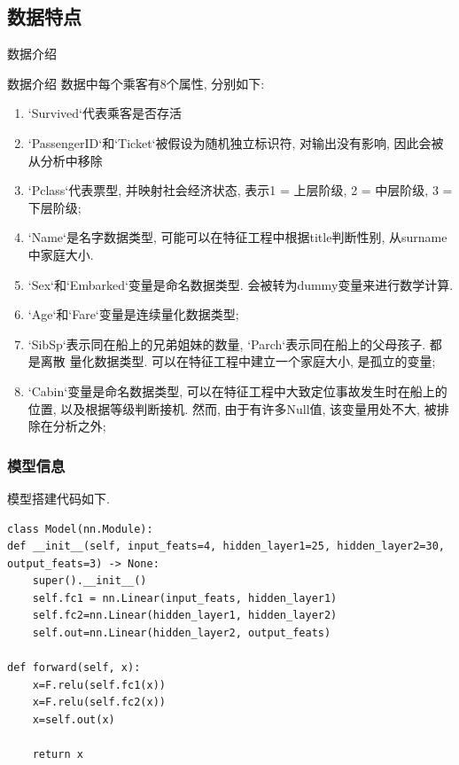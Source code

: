 \documentclass{beamer}
\begin{document}
\subsection{数据特点}
\begin{frame}[fragile]{数据介绍}
	\begin{block}{数据介绍}
		数据中每个乘客有8个属性, 分别如下:
		\begin{enumerate}
			\item<only@1> `Survived`代表乘客是否存活
			\item<only@1> `PassengerID`和`Ticket`被假设为随机独立标识符, 对输出没有影响, 因此会被从分析中移除
			\item<only@1> `Pclass`代表票型, 并映射社会经济状态, 表示1 = 上层阶级, 2 = 中层阶级, 3 = 下层阶级;
			\item<only@1> `Name`是名字数据类型, 可能可以在特征工程中根据title判断性别, 从surname中家庭大小.

			\item<only@2> `Sex`和`Embarked`变量是命名数据类型. 会被转为dummy变量来进行数学计算.
			\item<only@2> `Age`和`Fare`变量是连续量化数据类型;
			\item<only@2> `SibSp`表示同在船上的兄弟姐妹的数量, `Parch`表示同在船上的父母孩子. 都是离散
				量化数据类型. 可以在特征工程中建立一个家庭大小, 是孤立的变量;
			\item `Cabin`变量是命名数据类型, 可以在特征工程中大致定位事故发生时在船上的位置, 以及根据等级判断接机. 然而, 由于有许多Null值, 该变量用处不大, 被排除在分析之外;
		\end{enumerate}
	\end{block}
\end{frame}

\begin{frame}[fragile]
	\frametitle{模型信息}
	模型搭建代码如下.
	\begin{verbatim}
class Model(nn.Module):
def __init__(self, input_feats=4, hidden_layer1=25, hidden_layer2=30, output_feats=3) -> None:
	super().__init__()
	self.fc1 = nn.Linear(input_feats, hidden_layer1)
	self.fc2=nn.Linear(hidden_layer1, hidden_layer2)
	self.out=nn.Linear(hidden_layer2, output_feats)

def forward(self, x):
	x=F.relu(self.fc1(x))
	x=F.relu(self.fc2(x))
	x=self.out(x)

	return x
	\end{verbatim}
\end{frame}
\end{document}
